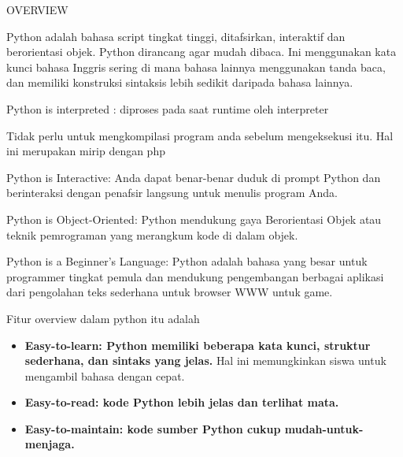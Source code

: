 
\sloppy
{\fontsize{14pt}{14pt}\selectfont OVERVIEW \\} \par
\noindent 
{\fontsize{14pt}{14pt}\selectfont Python adalah bahasa script tingkat tinggi, ditafsirkan, interaktif dan berorientasi objek. Python dirancang agar mudah dibaca. Ini menggunakan kata kunci bahasa Inggris sering di mana bahasa lainnya menggunakan tanda baca, dan memiliki konstruksi sintaksis lebih sedikit daripada bahasa lainnya. \\} \par
\vspace{14pt}
\noindent 
{\fontsize{14pt}{14pt}\selectfont Python is interpreted : diproses pada saat runtime oleh interpreter \\} \par
\vspace{14pt}
\noindent 
{\fontsize{14pt}{14pt}\selectfont Tidak perlu untuk mengkompilasi program anda sebelum mengeksekusi itu. Hal ini merupakan mirip dengan php \\} \par
\vspace{14pt}
\noindent 
{\fontsize{14pt}{14pt}\selectfont Python is Interactive: Anda dapat benar-benar duduk di prompt Python dan berinteraksi dengan penafsir langsung untuk menulis program Anda. \\} \par
\noindent 
{\fontsize{14pt}{14pt}\selectfont Python is Object-Oriented: Python mendukung gaya Berorientasi Objek atau teknik pemrograman yang merangkum kode di dalam objek. \\} \par
\noindent 
{\fontsize{14pt}{14pt}\selectfont Python is a Beginner's Language: Python adalah bahasa yang besar untuk programmer tingkat pemula dan mendukung pengembangan berbagai aplikasi dari pengolahan teks sederhana untuk browser WWW untuk game. \\} \par
\vspace{14pt}
\noindent 
{\fontsize{14pt}{14pt}\selectfont Fitur overview dalam python itu adalah \\} \par
\vspace{14pt}
\noindent 
\begin{itemize}
\item {\fontsize{11pt}{11pt}\selectfont \textbf{Easy-to-learn: Python memiliki beberapa kata kunci, struktur sederhana, dan sintaks yang jelas.} $  $Hal ini memungkinkan siswa untuk mengambil bahasa dengan cepat.} \par
\noindent 
\item {\fontsize{11pt}{11pt}\selectfont \textbf{Easy-to-read: kode Python lebih jelas dan terlihat mata.}} \par
\noindent 
\item {\fontsize{11pt}{11pt}\selectfont \textbf{Easy-to-maintain: kode sumber Python cukup mudah-untuk-menjaga.}}\end{itemize}
